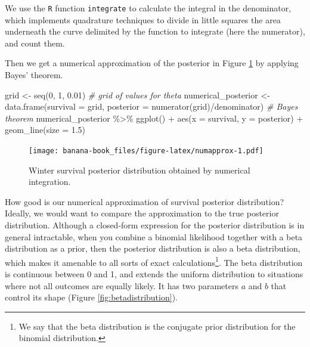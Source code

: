 \documentclass[
  12pt,
]{krantz}
\newenvironment{Shaded}{\begin{snugshade}}{\end{snugshade}}
\newcommand{\AttributeTok}[1]{\textcolor[rgb]{0.77,0.63,0.00}{#1}}
\newcommand{\CommentTok}[1]{\textcolor[rgb]{0.56,0.35,0.01}{\textit{#1}}}
\newcommand{\DecValTok}[1]{\textcolor[rgb]{0.00,0.00,0.81}{#1}}
\newcommand{\FloatTok}[1]{\textcolor[rgb]{0.00,0.00,0.81}{#1}}
\newcommand{\FunctionTok}[1]{\textcolor[rgb]{0.00,0.00,0.00}{#1}}
\newcommand{\NormalTok}[1]{#1}
\newcommand{\OtherTok}[1]{\textcolor[rgb]{0.56,0.35,0.01}{#1}}
\newcommand{\SpecialCharTok}[1]{\textcolor[rgb]{0.00,0.00,0.00}{#1}}
\begin{document}
We use the \texttt{R} function \texttt{integrate} to calculate the integral in the denominator, which implements quadrature techniques to divide in little squares the area underneath the curve delimited by the function to integrate (here the numerator), and count them.

Then we get a numerical approximation of the posterior in Figure \ref{fig:numapprox} by applying Bayes' theorem.

\begin{Shaded}
\begin{Highlighting}[]
\NormalTok{grid }\OtherTok{\textless{}{-}} \FunctionTok{seq}\NormalTok{(}\DecValTok{0}\NormalTok{, }\DecValTok{1}\NormalTok{, }\FloatTok{0.01}\NormalTok{) }\CommentTok{\# grid of values for theta}
\NormalTok{numerical\_posterior }\OtherTok{\textless{}{-}} \FunctionTok{data.frame}\NormalTok{(}\AttributeTok{survival =}\NormalTok{ grid, }
                                  \AttributeTok{posterior =} \FunctionTok{numerator}\NormalTok{(grid)}\SpecialCharTok{/}\NormalTok{denominator) }\CommentTok{\# Bayes\textquotesingle{} theorem}
\NormalTok{numerical\_posterior }\SpecialCharTok{\%\textgreater{}\%}
  \FunctionTok{ggplot}\NormalTok{() }\SpecialCharTok{+}
  \FunctionTok{aes}\NormalTok{(}\AttributeTok{x =}\NormalTok{ survival, }\AttributeTok{y =}\NormalTok{ posterior) }\SpecialCharTok{+} 
  \FunctionTok{geom\_line}\NormalTok{(}\AttributeTok{size =} \FloatTok{1.5}\NormalTok{)}
\end{Highlighting}
\end{Shaded}

\begin{figure}
\centering
\texttt{[image: banana-book\_files/figure-latex/numapprox-1.pdf]}
\caption{\label{fig:numapprox}Winter survival posterior distribution obtained by numerical integration.}
\end{figure}

How good is our numerical approximation of survival posterior distribution? Ideally, we would want to compare the approximation to the true posterior distribution. Although a closed-form expression for the posterior distribution is in general intractable, when you combine a binomial likelihood together with a beta distribution as a prior, then the posterior distribution is also a beta distribution, which makes it amenable to all sorts of exact calculations\footnote{We say that the beta distribution is the conjugate prior distribution for the binomial distribution.}. The beta distribution is continuous between 0 and 1, and extends the uniform distribution to situations where not all outcomes are equally likely. It has two parameters \(a\) and \(b\) that control its shape (Figure \ref{fig:betadistribution}).
\end{document}
